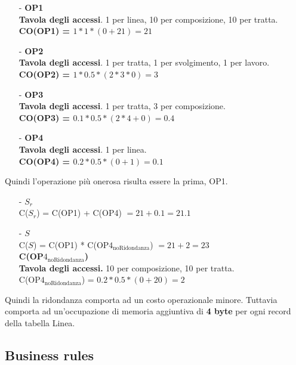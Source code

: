 \documentclass{article}
\begin{document}
\begin{itemize}
    \itemsep0em
    \item[-] \textbf{OP1} \\ \textbf{Tavola degli accessi}. 1 per linea, 10 per composizione, 10 per tratta. \vspace*{7pt}\\ \textbf{CO(OP1) = $1 * 1 * (0 + 21) = 21$}
    \item[-] \textbf{OP2} \\ \textbf{Tavola degli accessi}. 1 per tratta, 1 per svolgimento, 1 per lavoro. \vspace*{7pt}\\ \textbf{CO(OP2) = $1 * 0.5 * (2 * 3 * 0) = 3$}
    \item[-] \textbf{OP3} \\ \textbf{Tavola degli accessi}. 1 per tratta, 3 per composizione. \vspace*{7pt}\\ \textbf{CO(OP3) = $0.1 * 0.5 * (2 * 4 + 0) = 0.4$}
    \item[-] \textbf{OP4} \\ \textbf{Tavola degli accessi}. 1 per linea. \vspace*{7pt}\\ \textbf{CO(OP4) = $0.2 * 0.5 * (0 + 1) = 0.1$}
\end{itemize}
Quindi l'operazione più onerosa risulta essere la prima, OP1.
\begin{itemize}
    \itemsep0em
    \item[-] \textbf{$S_r$} \\ C($S_r$) = C(OP1) + C(OP4) $= 21 + 0.1 = 21.1$
    \item[-] \textbf{$S$} \\ C($S$) = C(OP1) * C(OP$4_{\text{noRidondanza}}$) $= 21 + 2 = 23$ \vspace*{7pt}\\ \textbf{C(OP$4_{\text{noRidondanza}}$)} \\ \textbf{Tavola degli accessi.} 10 per composizione, 10 per tratta. \vspace*{7pt}\\  C(OP$4_{\text{noRidondanza}}$) = $0.2 * 0.5 * (0 + 20) = 2$
\end{itemize}
Quindi la ridondanza comporta ad un costo operazionale minore. Tuttavia comporta ad un'occupazione di memoria aggiuntiva di \textbf{4 byte} per ogni record della tabella Linea.

\subsection*{Business rules}
\end{document}

